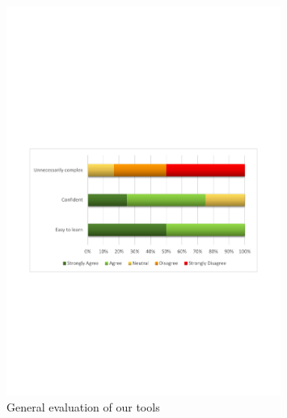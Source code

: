 \begin{figure}[H]
  \centering
    \includegraphics[width=0.8\textwidth]{images/charts/tool_general.pdf}
	\caption{General evaluation of our tools}
	\label{fig:tool_general}
\end{figure}

